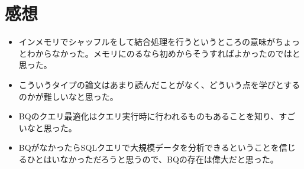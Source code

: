 \documentclass[dvipdfmx,uplatex]{jsarticle}
\theoremstyle{remark}
\newenvironment{kansou}{
    \begin{tcolorbox}[
        colframe=brown,
        colback=brown!10!white,
        colbacktitle=brown!40!white,
        coltitle=black,fonttitle=\bfseries
    ]
}{
    \end{tcolorbox}
}
\begin{document}
\section{感想}
\begin{kansou}
\begin{itemize}
  \item インメモリでシャッフルをして結合処理を行うというところの意味がちょっとわからなかった。メモリにのるなら初めからそうすればよかったのではと思った。
  \item こういうタイプの論文はあまり読んだことがなく、どういう点を学びとするのかが難しいなと思った。
  \item BQのクエリ最適化はクエリ実行時に行われるものもあることを知り、すごいなと思った。
  \item BQがなかったらSQLクエリで大規模データを分析できるということを信じるひとはいなかっただろうと思うので、BQの存在は偉大だと思った。
\end{itemize}
\end{kansou}



\end{document}
